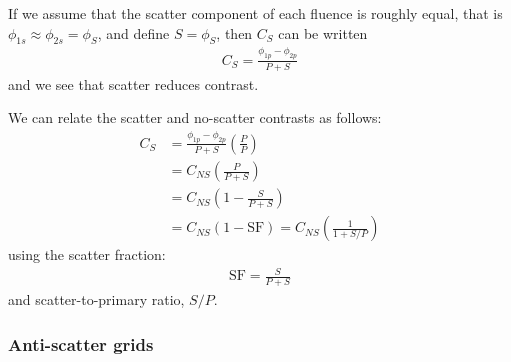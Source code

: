 \documentclass[mphy386-notes.tex]{subfiles}
\begin{document}
If we assume that the scatter component of each fluence is roughly equal, that is $\phi_{1s} \approx \phi_{2s} = \phi_S$, and define $S = \phi_S$, then $C_S$ can be written
\begin{align}
  C_S = \frac{\phi_{1p} - \phi_{2p}}{P + S}
\end{align}
and we see that scatter reduces contrast.

We can relate the scatter and no-scatter contrasts as follows:
\begin{align}
  C_S &= \frac{\phi_{1p} - \phi_{2p}}{P + S}\left(\frac{P}{P}\right)\\
      &= C_{NS}\left(\frac{P}{P + S}\right)\\
      &= C_{NS}\left(1 - \frac{S}{P + S}\right) \\
      &= C_{NS}(1 - \text{SF}) = C_{NS}\left(\frac{1}{1 + S/P}\right)
\end{align}
using the scatter fraction:
\begin{align}
  \text{SF} = \frac{S}{P + S}
\end{align}
and scatter-to-primary ratio, $S/P$. 

\subsubsection{Anti-scatter grids}


\pagebreak
\end{document}

